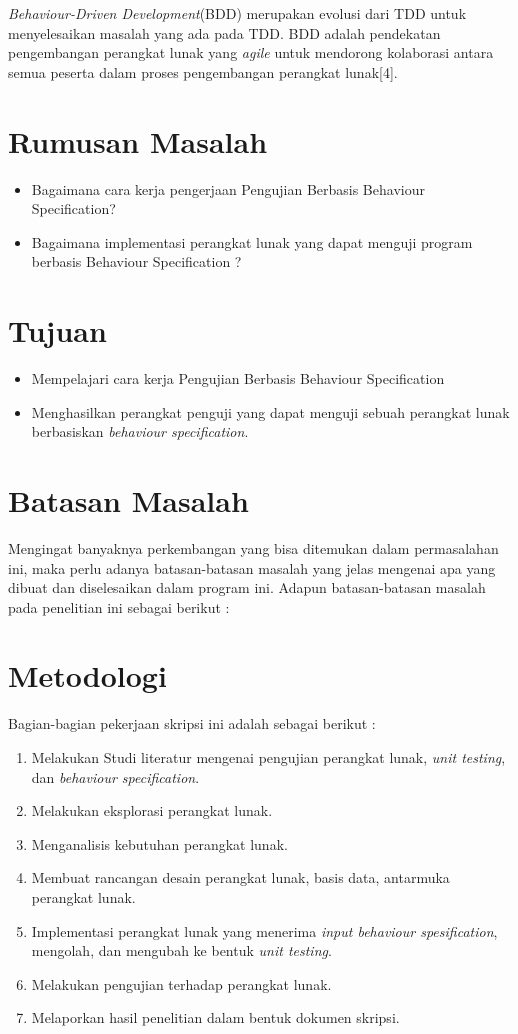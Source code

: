 \textit{Behaviour-Driven Development}(BDD) merupakan evolusi dari TDD untuk menyelesaikan masalah yang ada pada TDD. BDD adalah pendekatan pengembangan perangkat lunak yang \textit{agile} untuk mendorong kolaborasi antara semua peserta dalam proses pengembangan perangkat lunak[4].
\section{Rumusan Masalah}
\label{sec:rumusan}
\begin{itemize}
\item Bagaimana cara kerja pengerjaan Pengujian Berbasis Behaviour Specification?
\item Bagaimana implementasi perangkat lunak yang dapat menguji program berbasis Behaviour Specification ?	
\end{itemize}

\section{Tujuan}
\label{sec:tujuan}
\begin{itemize}
\item Mempelajari cara kerja Pengujian Berbasis Behaviour Specification
\item Menghasilkan perangkat penguji yang dapat menguji sebuah perangkat lunak berbasiskan \textit{behaviour specification}.
\end{itemize}

\section{Batasan Masalah}
\label{sec:batasan}
Mengingat banyaknya perkembangan yang bisa ditemukan dalam permasalahan ini, maka perlu adanya batasan-batasan masalah yang jelas mengenai apa yang dibuat dan diselesaikan dalam program ini. Adapun batasan-batasan masalah pada penelitian ini sebagai berikut :

\section{Metodologi}
\label{sec:metlit}
Bagian-bagian pekerjaan skripsi ini adalah sebagai berikut :
\begin{enumerate}
\item Melakukan Studi literatur mengenai pengujian perangkat lunak, \textit{unit testing}, dan \textit{behaviour specification}.
\item Melakukan eksplorasi perangkat lunak.
\item Menganalisis kebutuhan perangkat lunak.
\item Membuat rancangan desain perangkat lunak, basis data, antarmuka perangkat lunak.
\item Implementasi perangkat lunak yang menerima \textit{input behaviour spesification}, mengolah, dan mengubah ke bentuk \textit{unit testing}.
\item Melakukan pengujian terhadap perangkat lunak.
\item Melaporkan hasil penelitian dalam bentuk dokumen skripsi.
\end{enumerate}


